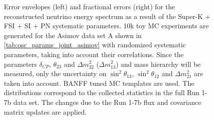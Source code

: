 \begin{figure}[htb]
\caption {
Error envelopes (left) and fractional errors (right) for the reconstructed neutrino energy spectrum
as a result of the Super-K + FSI + SI + PN systematic parameters.
10k toy MC experiments are generated for the Asimov data set A shown in \cref{tab:osc_params_joint_asimov}
with randomized systematic parameters, taking into account their correlations.
Since the parameters $\delta_{CP}$, $\theta_{23}$ and $\Delta m^2_{32}$ ($\Delta m^2_{13}$) and mass hierarchy
will be measured,
only the uncertainty on 
$\sin^2 \theta_{13}$,
$\sin^2 \theta_{12}$
and 
$\Delta m^2_{21}$ 
are taken into account.
BANFF tuned MC templates are used. 
The distributions correspond to the collected statistics in the full Run 1-7b data set.
The changes due to the Run 1-7b flux and covariance matrix updates are applied.
}
\label{fig:SKDet_FSI_envelope_Asimov_A_run17b}
\end{figure}




